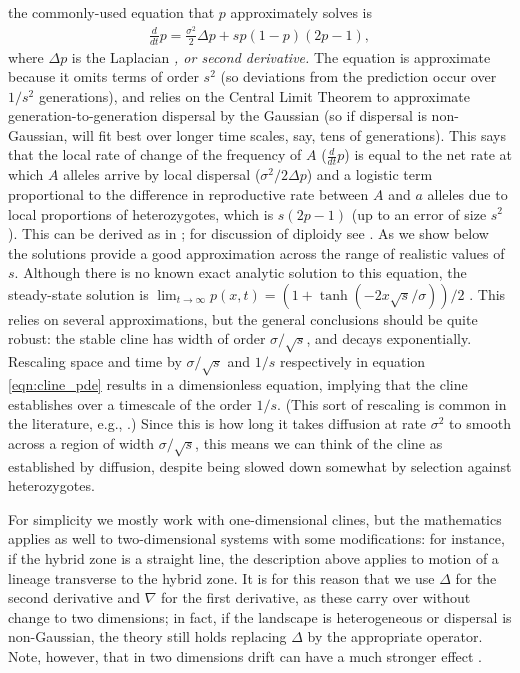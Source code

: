 \documentclass[11pt,letterpaper]{article}
\newcommand{\alisa}[1]{{\em \color{red} #1}}
\newcommand{\grad}{\nabla}
\begin{document}
the commonly-used equation that $p$ approximately solves is
\begin{align} \label{eqn:cline_pde}
    \frac{d}{dt} p = \frac{\sigma^2}{2} \Delta p + s p (1-p) (2p-1) ,
\end{align}
where $\Delta p$ is the Laplacian\alisa{, or second derivative.}
The equation is approximate because it 
omits terms of order $s^2$
(so deviations from the prediction occur over $1/s^2$ generations),
and relies on the Central Limit Theorem to approximate generation-to-generation dispersal by the Gaussian
(so if dispersal is non-Gaussian, will fit best over longer time scales, say, tens of generations).  
This says that the local rate of change of the frequency of $A$ ($\frac{d}{dt} p$)
is equal to the net rate at which $A$ alleles arrive by local dispersal ($\sigma^2/2 \Delta p$)
and a logistic term proportional to the difference in reproductive rate between $A$ and $a$ alleles
due to local proportions of heterozygotes,
which is $s(2p-1)$ (up to an error of size $s^2$).
This can be derived as in \citet{Nagylaki1975};
for discussion of diploidy see \citet{christiansen1995genotypic}.
As we show below the solutions provide a good approximation across the range of realistic values of $s$.
Although there is no known exact analytic solution to this equation, 
the steady-state solution is
$\lim_{t \to \infty} p(x,t) = (1+\tanh(-2x\sqrt{s}/\sigma))/2$ \citep{Bazykin1969}. 
This relies on several approximations, but the general conclusions should be quite robust: 
the stable cline has width of order $\sigma/\sqrt{s}$, and decays exponentially. 
Rescaling space and time by $\sigma/\sqrt{s}$ and $1/s$ respectively in equation \eqref{eqn:cline_pde} 
results in a dimensionless equation,
implying that the cline establishes over a timescale of the order $1/s$. 
(This sort of rescaling is common in the literature, e.g., \citep{fisher1950frequencies,Slatkin1973}.)  
Since this is how long it takes diffusion at rate $\sigma^2$ to smooth across a region of width $\sigma/\sqrt{s}$,
this means we can think of
the cline as established by diffusion, 
despite being slowed down somewhat by selection against heterozygotes. 

For simplicity we mostly work with one-dimensional clines,
but the mathematics applies as well to two-dimensional systems with some modifications:
for instance, if the hybrid zone is a straight line, 
the description above applies to motion of a lineage transverse to the hybrid zone.  
It is for this reason that we use $\Delta$ for the second derivative and $\grad$ for the first derivative,
as these carry over without change to two dimensions;
in fact, if the landscape is heterogeneous or dispersal is non-Gaussian,
the theory still holds replacing $\Delta$ by the appropriate operator.
Note, however, that in two dimensions drift can have a much stronger effect \citep{cox1995hybrid,barton2010phylogeography,durrett2007width}.
\end{document}
